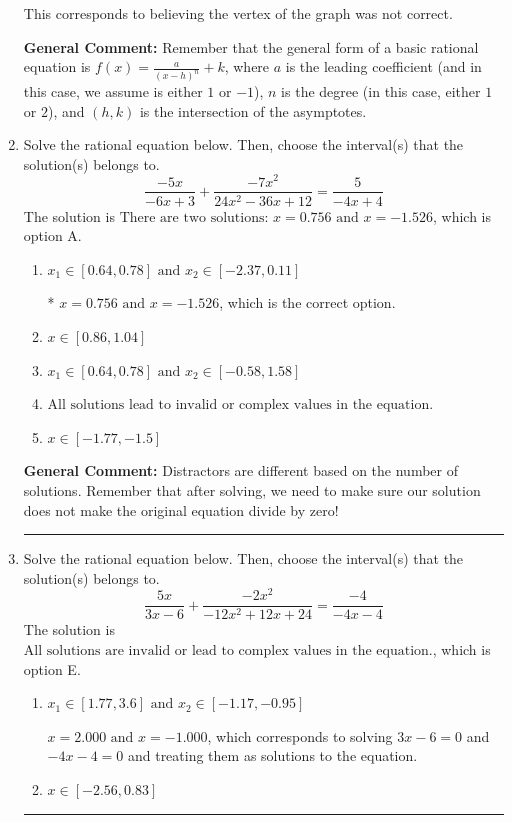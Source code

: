 \documentclass{extbook}[14pt]
\newcommand{\litem}[1]{\item #1

\rule{\textwidth}{0.4pt}}
\begin{document}
\begin{enumerate}
{\begin{enumerate}[label=\Alph*.]
This corresponds to believing the vertex of the graph was not correct.
\end{enumerate}

\textbf{General Comment:} Remember that the general form of a basic rational equation is $ f(x) = \frac{a}{(x-h)^n} + k$, where $a$ is the leading coefficient (and in this case, we assume is either $1$ or $-1$), $n$ is the degree (in this case, either $1$ or $2$), and $(h, k)$ is the intersection of the asymptotes.
}
\litem{
Solve the rational equation below. Then, choose the interval(s) that the solution(s) belongs to.
\[ \frac{-5x}{-6x + 3} + \frac{-7x^{2}}{24x^{2} -36 x + 12} = \frac{5}{-4x + 4} \]The solution is \( \text{There are two solutions: } x = 0.756 \text{ and } x = -1.526 \), which is option A.\begin{enumerate}[label=\Alph*.]
\item \( x_1 \in [0.64, 0.78] \text{ and } x_2 \in [-2.37,0.11] \)

* $x = 0.756 \text{ and } x = -1.526$, which is the correct option.
\item \( x \in [0.86,1.04] \)


\item \( x_1 \in [0.64, 0.78] \text{ and } x_2 \in [-0.58,1.58] \)


\item \( \text{All solutions lead to invalid or complex values in the equation.} \)


\item \( x \in [-1.77,-1.5] \)


\end{enumerate}

\textbf{General Comment:} Distractors are different based on the number of solutions. Remember that after solving, we need to make sure our solution does not make the original equation divide by zero!
}
\litem{
Solve the rational equation below. Then, choose the interval(s) that the solution(s) belongs to.
\[ \frac{5x}{3x -6} + \frac{-2x^{2}}{-12x^{2} +12 x + 24} = \frac{-4}{-4x -4} \]The solution is \( \text{All solutions are invalid or lead to complex values in the equation.} \), which is option E.\begin{enumerate}[label=\Alph*.]
\item \( x_1 \in [1.77, 3.6] \text{ and } x_2 \in [-1.17,-0.95] \)

$x = 2.000 \text{ and } x = -1.000$, which corresponds to solving $3x -6 = 0$ and $-4x -4 = 0$ and treating them as solutions to the equation.
\item \( x \in [-2.56,0.83] \)


\end{enumerate}}
\end{enumerate}
\end{document}
